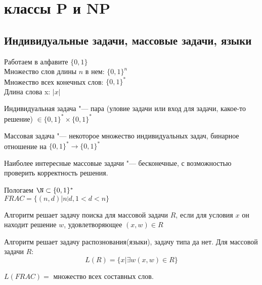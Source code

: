 
\setcounter{section}{4}
\chapter{классы P и NP} 
\section{Индивидуальные задачи, массовые задачи, языки}
\begin{Def}
Работаем в алфавите $\{0, 1\}$\\
Множество слов длины $n$ в нем: $\{0, 1\}^n$\\
Множество всех конечных слов: $\{0, 1\}^*$\\ 
Длина слова x: $|x|$\\
\end{Def}
\begin{Def}
Индивидуальная задача "--- пара (уловие задачи или вход для задачи, какое-то решение) $\in \{0, 1\}^* \times \{0, 1\}^*$\\
\end{Def}
\begin{Def}
Массовая задача "--- некоторое множество индивидуальных задач, 
бинарное отношение на $\{0, 1\}^* \to \{0, 1\}^*$\\
\end{Def}

Наиболее интересные массовые задачи "--- бесконечные, 
с возможностью проверить корректность решения. 

\begin{exmp}
Пологаем $\N \subset \{0, 1\}^*$\\
$FRAC = \{(n, d) | n \vdots d, 1 < d < n\}$\\
\end{exmp}
\begin{Def}
Алгоритм решает задачу поиска для массовой задачи $R$, 
если для условия $x$ он находит решение $w$, 
удовлетворяющее $(x, w) \in R$
\end{Def}

\begin{Def}
Алгоритм решает задачу распознования(языки), задачу 
типа да нет. Для массовой задачи $R$:
$$L(R) = \{x | \exists w (x, w) \in R\} $$
\end{Def}

\begin{exmp}
$L(FRAC) =$ множество всех составных слов. 
\end{exmp}
